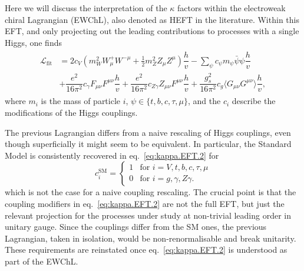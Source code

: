 Here we will discuss the interpretation of the $\kappa$ factors within the electroweak chiral Lagrangian (EWChL), also denoted as HEFT in the literature. Within this EFT, and only projecting out the leading contributions to processes with a single Higgs, one finds\cite{Buchalla:2015qju,Buchalla:2015wfa,deBlas:2018tjm}
\begin{align}
  \begin{aligned}
    \label{eq:kappa.EFT.2}
    \mathcal{L}_{\text{fit}} &= 2 c_{V} \left(m_{W}^{2}W_{\mu}^{+}W^{-\mu} +\tfrac{1}{2} m^2_Z Z_{\mu}Z^{\mu}\right) \dfrac{h}{v} - \sum_{\psi}c_{\psi} m_{\psi} \bar{\psi} \psi \dfrac{h}{v} \\
 &+ \dfrac{e^{2}}{16\pi^{2}} c_{\gamma} F_{\mu\nu}F^{\mu\nu} \dfrac{h}{v}+ \dfrac{e^{2}}{16\pi^{2}} c_{Z\gamma} Z_{\mu\nu}F^{\mu\nu} \dfrac{h}{v}+\dfrac{g_{s}^{2}}{16\pi^{2}} c_{g}\langle G_{\mu\nu}G^{\mu\nu}\rangle\dfrac{h}{v},
  \end{aligned}
\end{align}
where $m_{i}$ is the mass of particle $i$, $\psi \in \{t, b, c, \tau, \mu\}$, and the $c_{i}$ describe the modifications of the Higgs couplings.

The previous Lagrangian differs from a naive rescaling of Higgs couplings, even though superficially it might seem to be equivalent. In particular, the Standard Model is consistently recovered in eq.~\eqref{eq:kappa.EFT.2} for
\begin{equation}
  \label{eq:kappa.EFT.3}
    c_{i}^{\text{SM}} = \begin{cases} 1 & \text{for } i = V, t, b, c, \tau, \mu\\ 0 & \text{for } i = g, \gamma, Z\gamma. \end{cases}
\end{equation} 
which is not the case for a naive coupling rescaling. The crucial point is that the coupling modifiers in eq.~\eqref{eq:kappa.EFT.2} are not the full EFT, but just the relevant projection for the processes under study at non-trivial leading order in unitary gauge. Since the couplings differ from the SM ones, the previous Lagrangian, taken in isolation, would be non-renormalisable and break unitarity. These requirements are reinstated once eq.~\eqref{eq:kappa.EFT.2} is understood as part of the EWChL.
 
